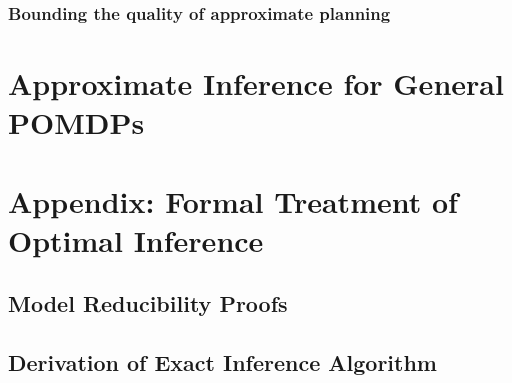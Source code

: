 \documentclass[10pt]{article}
\newcommand{\PP}[2][]{\mathbb{P\!}_{#1}\left[#2\right]}
\newcommand{\PPlb}[2][]{\mathbb{P}^\text{lb}_{#1}\left[#2\right]}
\newcommand{\PPub}[2][]{\mathbb{P}^\text{ub}_{#1}\left[#2\right]}
\newcommand{\PPexact}{\mathbb{P}^\text{exact}}
\begin{document}

% 
% 
% 
% 
% 

\subsubsection{Bounding the quality of approximate planning}

\section{Approximate Inference for General POMDPs}

\appendix
\section{Appendix: Formal Treatment of Optimal Inference}
\subsection{Model Reducibility Proofs}
\subsection{Derivation of Exact Inference Algorithm}
\end{document}
